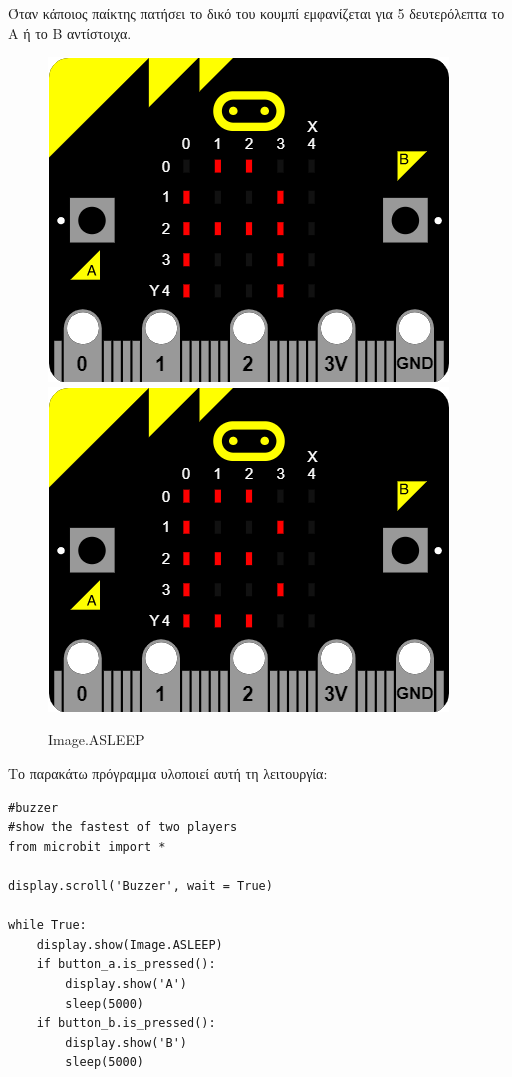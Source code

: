 \documentclass[11pt]{article}
\begin{document}
Όταν κάποιος παίκτης πατήσει το δικό του κουμπί εμφανίζεται για 5 δευτερόλεπτα το Α ή το Β αντίστοιχα.
\begin{figure}[!h]
\begin{center}
\includegraphics{a.png}\hspace{5em}\includegraphics{b.png}
\caption{Image.ASLEEP}
\end{center}
\end{figure}

Το παρακάτω πρόγραμμα υλοποιεί αυτή τη λειτουργία:
\begin{lstlisting}
#buzzer
#show the fastest of two players
from microbit import *

display.scroll('Buzzer', wait = True)

while True:
    display.show(Image.ASLEEP)
    if button_a.is_pressed():
        display.show('A')
        sleep(5000)
    if button_b.is_pressed():
        display.show('B')
        sleep(5000)
\end{lstlisting}
\end{document}
